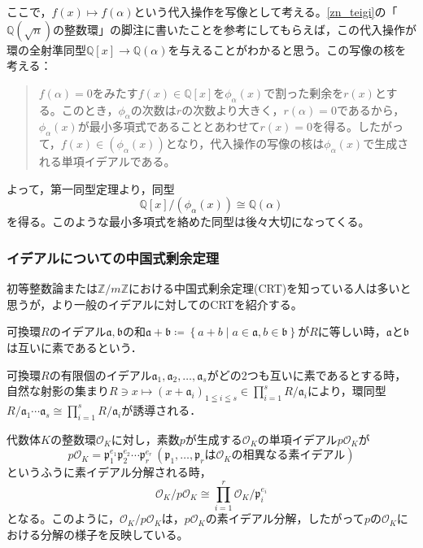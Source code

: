 ここで，$f(x)\mapsto f(\alpha)$という代入操作を写像として考える。\ref{zn_teigi}の「$\mathbb{Q}(\sqrt{n})$の整数環」の脚注に書いたことを参考にしてもらえば，この代入操作が環の全射準同型$\mathbb{Q}[x]\rightarrow \mathbb{Q}(\alpha)$を与えることがわかると思う。この写像の核を考える：
\begin{quote}
    $f(\alpha)=0$をみたす$f(x)\in\mathbb{Q}[x]$を$\phi_{\alpha}(x)$で割った剰余を$r(x)$とする。このとき，$\phi_{\alpha}$の次数は$r$の次数より大きく，$r(\alpha)=0$であるから，$\phi_{\alpha}(x)$が最小多項式であることとあわせて$r(x)=0$を得る。したがって，$f(x)\in(\phi_{\alpha}(x))$となり，代入操作の写像の核は$\phi_{\alpha}(x)$で生成される単項イデアルである。
\end{quote}
よって，第一同型定理より，同型
\begin{equation}\label{dokei_sp}
    \mathbb{Q}[x]/(\phi_{\alpha}(x))\cong \mathbb{Q}(\alpha)
\end{equation}
を得る。このような最小多項式を絡めた同型は後々大切になってくる。

\subsubsection{イデアルについての中国式剰余定理}
初等整数論または$\mathbb{Z}/{m\mathbb{Z}}$における中国式剰余定理(CRT)を知っている人は多いと思うが，より一般のイデアルに対してのCRTを紹介する。

\begin{dfn}
    可換環$R$のイデアル$\mathfrak{a,b}$の和$\mathfrak{a+b}\coloneqq \left\{a+b\mid a\in\mathfrak{a},b\in\mathfrak{b}\right\}$が$R$に等しい時，$\mathfrak{a}$と$\mathfrak{b}$は互いに素であるという．
\end{dfn}

\begin{thm}[CRT]
    可換環$R$の有限個のイデアル$\mathfrak{a}_1,\mathfrak{a}_2,\ldots,\mathfrak{a}_s$がどの2つも互いに素であるとする時，自然な射影の集まり$R\ni x\mapsto (x+\mathfrak{a}_i)_{1\leqq i\leqq s}\in\prod_{i=1}^{s}R/{\mathfrak{a}_i}$により，環同型$R/{\mathfrak{a}_1\cdots\mathfrak{a}_s}\cong\prod_{i=1}^{s}R/{\mathfrak{a}_i}$が誘導される．
\end{thm}

代数体$K$の整数環$\mathcal{O}_K$に対し，素数$p$が生成する$\mathcal{O}_K$の単項イデアル$p\mathcal{O}_K$が\[
p\mathcal{O}_K=\mathfrak{p}_1^{e_1}\mathfrak{p}_2^{e_2}\cdots\mathfrak{p}_r^{e_r}\,(\mathfrak{p}_1,\ldots,\mathfrak{p}_r\text{は}\mathcal{O}_K\text{の相異なる素イデアル})
\]というふうに素イデアル分解される時，
\begin{equation}\label{crt_apply}
\mathcal{O}_K/{p\mathcal{O}_K}\cong \prod_{i=1}^{r}\mathcal{O}_K/{\mathfrak{p}_i^{e_i}}
\end{equation}
となる。このように，$\mathcal{O}_K/{p\mathcal{O}_K}$は，$p\mathcal{O}_K$の素イデアル分解，したがって$p$の$\mathcal{O}_K$における分解の様子を反映している。

